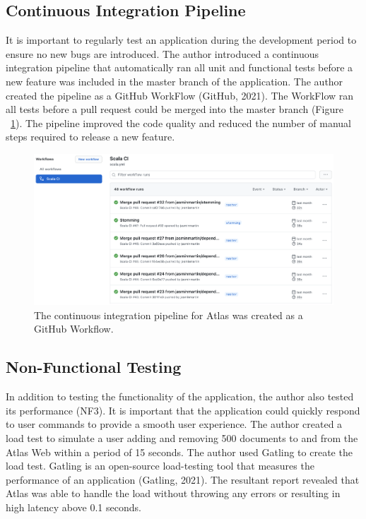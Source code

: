 \documentclass{article}
\begin{document}
\subsection{Continuous Integration Pipeline}

It is important to regularly test an application during the development period to ensure no new bugs are introduced. The author introduced a continuous integration pipeline that automatically ran all unit and functional tests before a new feature was included in the master branch of the application. The author created the pipeline as a GitHub WorkFlow (GitHub, 2021). The WorkFlow ran all tests before a pull request could be merged into the master branch (Figure ~\ref{fig:githubflow}). The pipeline improved the code quality and reduced the number of manual steps required to release a new feature.

\begin{figure}[!htb]
  \centering
      \includegraphics[width=1\textwidth]{images/scala-ci.png}
  \caption{The continuous integration pipeline for Atlas was created as a GitHub Workflow.}
  \label{fig:githubflow}
\end{figure}

\subsection{Non-Functional Testing}
In addition to testing the functionality of the application, the author also tested its performance (NF3). It is important that the application could quickly respond to user commands to provide a smooth user experience. The author created a load test to simulate a user adding and removing 500 documents to and from the Atlas Web within a period of 15 seconds. The author used Gatling to create the load test. Gatling is an open-source load-testing tool that measures the performance of an application (Gatling, 2021). The resultant report revealed that Atlas was able to handle the load without throwing any errors or resulting in high latency above 0.1 seconds.
\end{document}
